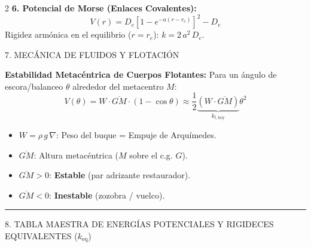 \documentclass[10pt,a4paper]{article}
\newcommand{\seccion}[1]{%
  \vspace{2mm}%
  \noindent\colorbox{urlblue}{\parbox{\dimexpr\linewidth-2\fboxsep\relax}{%
    \color{white}\footnotesize\bfseries\strut\MakeUppercase{#1}}}%
  \vspace{1.5mm}%
}
\begin{document}
\begin{multicols}{2}
\textbf{6. Potencial de Morse (Enlaces Covalentes):}
\begin{equation*}
  V(r) = D_e \left[ 1 - e^{-a(r-r_e)} \right]^2 - D_e
\end{equation*}
Rigidez armónica en el equilibrio ($r=r_e$): $k = 2\,a^2\,D_e$.

\seccion{7. Mecánica de Fluidos y Flotación}

\textbf{Estabilidad Metacéntrica de Cuerpos Flotantes:}
Para un ángulo de escora/balanceo $\theta$ alrededor del metacentro $M$:
\begin{equation*}
  V(\theta) = W\cdot \overline{GM}\cdot(1 - \cos\theta) \approx \frac{1}{2}\underbrace{\left(W\cdot \overline{GM}\right)}_{k_{t,\text{boy}}}\theta^2
\end{equation*}
\begin{itemize}\setlength{\itemsep}{0pt}\setlength{\parskip}{0pt}
  \item $W = \rho\,g\,\nabla$: Peso del buque = Empuje de Arquímedes.
  \item $\overline{GM}$: Altura metacéntrica ($M$ sobre el c.g. $G$).
  \item $\overline{GM} > 0$: \textbf{Estable} (par adrizante restaurador).
  \item $\overline{GM} < 0$: \textbf{Inestable} (zozobra / vuelco).
\end{itemize}

\end{multicols}

\vspace{-1.5mm}
\noindent\textcolor{linegray}{\rule{\linewidth}{1pt}}
\vspace{-1mm}

\seccion{8. Tabla Maestra de Energías Potenciales y Rigideces Equivalentes ($k_{\text{eq}}$)}
\vspace{0.5mm}
\end{document}
